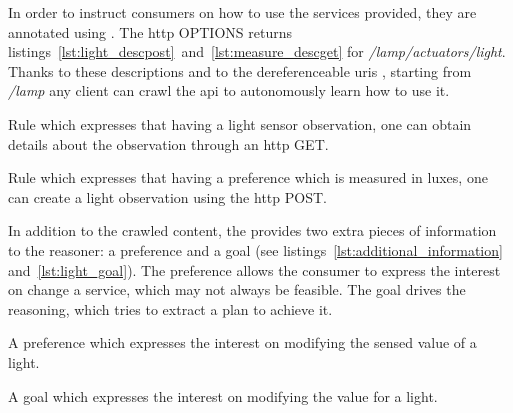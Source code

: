 
In order to instruct consumers on how to use the services provided, they are annotated using \restdesc{}.
The \acs{http} OPTIONS returns listings~\ref{lst:light_descpost}~and~\ref{lst:measure_descget} for \emph{/lamp/actuators/light}.
Thanks to these descriptions and to the dereferenceable \acsp{uri} \citep{sauermann_cool_2008}, starting from \emph{/lamp} any client can crawl the \acs{api} to autonomously learn how to use it. %


\begin{listing}
  
  \caption{Rule which expresses that having a light sensor observation, one can obtain details about the observation through an \acs{http} GET.}
  \label{lst:measure_descget}
\end{listing}

\begin{listing}
  
  \caption{Rule which expresses that having a preference which is measured in luxes, one can create a light observation using the \acs{http} POST.}
  \label{lst:light_descpost}
\end{listing}


In addition to the crawled content, the \nodeb{} provides two extra pieces of information to the reasoner: a preference and a goal (see listings~\ref{lst:additional_information} and~\ref{lst:light_goal}).
The preference allows the consumer to express the interest on change a service, which may not always be feasible.
The goal drives the reasoning, which tries to extract a plan to achieve it.

\begin{listing}
  
  \caption{A preference which expresses the interest on modifying the sensed value of a light.}
  \label{lst:additional_information}
\end{listing}

\begin{listing}
  
  \caption{A goal which expresses the interest on modifying the value for a light.}
  \label{lst:light_goal}
\end{listing}

